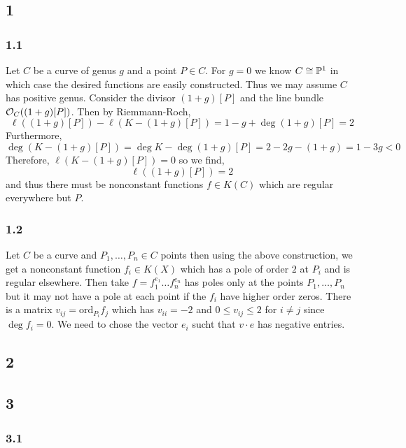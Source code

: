 \documentclass[12pt]{article}
\begin{document}
\subsection{1}

\subsubsection{1.1}

Let $C$ be a curve of genus $g$ and a point $P \in C$. For $g = 0$ we know $C \cong \P^1$ in which case the desired functions are easily constructed. Thus we may assume $C$ has positive genus. Consider the divisor $(1 + g)[P]$ and the line bundle $\struct{C}((1 + g)[P])$. Then by Riemmann-Roch,
\[ \ell((1 + g)[P]) - \ell(K - (1 + g)[P]) = 1 - g + \deg{(1 + g) [P]} = 2 \]
Furthermore,
\[ \deg{(K - (1+g)[P])} = \deg{K} - \deg{(1 + g)[P]} = 2 - 2g - (1 + g) = 1 - 3 g < 0 \]
Therefore, $\ell(K - (1 + g)[P]) = 0$ so we find,
\[ \ell((1 + g)[P]) = 2 \]
and thus there must be nonconstant functions $f \in K(C)$ which are regular everywhere but $P$. 

\subsubsection{1.2}

Let $C$ be a curve and $P_1, \dots, P_n \in C$ points then using the above construction, we get a nonconstant function $f_i \in K(X)$ which has a pole of order $2$ at $P_i$ and is regular elsewhere. Then take $f = f_1^{e_1} \dots f_n^{e_n}$ has poles only at the points $P_1, \dots, P_n$ but it may not have a pole at each point if the $f_i$ have higher order zeros. There is a matrix $v_{ij} = \mathrm{ord}_{P_i} f_j$ which has $v_{ii} = -2$ and $0 \le v_{ij} \le 2$ for $i \neq j$ since $\deg{f_i} = 0$. We need to chose the vector $e_i$ sucht that $v \cdot e$ has negative entries. 

\subsection{2}

\subsection{3}

\subsubsection{3.1}
\end{document}
